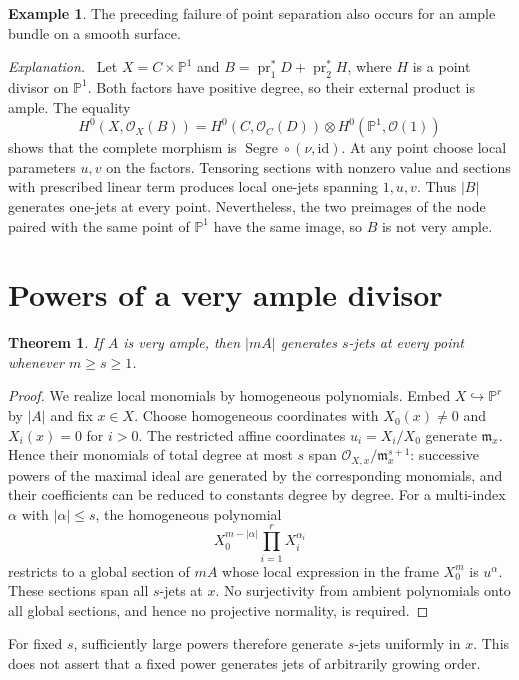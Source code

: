 \documentclass[12pt,a4paper,psamsfonts]{amsart}
\newtheorem{theorem}[lemma]{Theorem}
\theoremstyle{definition}
\newtheorem{example}[lemma]{Example}
\newenvironment{explanation}{\par\noindent\emph{Explanation.}\ }{\par}
\newcommand{\OO}{\mathcal O}
\begin{document}
\begin{example}
The preceding failure of point separation also occurs for an ample
bundle on a smooth surface.
\end{example}
\begin{explanation}
Let $X=C\times\mathbb P^1$ and
$B=\operatorname{pr}_1^*D+\operatorname{pr}_2^*H$, where $H$ is a
point divisor on $\mathbb P^1$.
Both factors have positive degree, so their external product is ample.
The equality
\[
 H^0(X,\OO_X(B))=H^0(C,\OO_C(D))\otimes H^0(\mathbb P^1,\OO(1))
\]
shows that the complete morphism is $\operatorname{Segre}\circ(\nu,\mathrm{id})$.
At any point choose local parameters $u,v$ on the factors. Tensoring
sections with nonzero value and sections with prescribed linear term
produces local one-jets spanning $1,u,v$. Thus $|B|$ generates one-jets
at every point. Nevertheless, the two preimages of the node paired
with the same point of $\mathbb P^1$ have the same image, so $B$ is
not very ample.
\end{explanation}

\section{Powers of a very ample divisor}
\begin{theorem}
If $A$ is very ample, then $|mA|$ generates $s$-jets at every point
whenever $m\ge s\ge1$.
\end{theorem}
\begin{proof}
We realize local monomials by homogeneous polynomials.
Embed $X\hookrightarrow\mathbb P^r$ by $|A|$ and fix $x\in X$.
Choose homogeneous coordinates with $X_0(x)\ne0$ and $X_i(x)=0$
for $i>0$. The restricted affine coordinates $u_i=X_i/X_0$ generate
$\mathfrak m_x$. Hence their monomials of total degree at most $s$
span $\OO_{X,x}/\mathfrak m_x^{s+1}$: successive powers of the maximal
ideal are generated by the corresponding monomials, and their
coefficients can be reduced to constants degree by degree.
For a multi-index $\alpha$ with $|\alpha|\le s$, the homogeneous
polynomial
\[
 X_0^{m-|\alpha|}\prod_{i=1}^r X_i^{\alpha_i}
\]
restricts to a global section of $mA$ whose local expression in the
frame $X_0^m$ is $u^\alpha$. These sections span all $s$-jets at $x$.
No surjectivity from ambient polynomials onto all global sections,
and hence no projective normality, is required.
\end{proof}
For fixed $s$, sufficiently large powers therefore generate $s$-jets
uniformly in $x$. This does not assert that a fixed power generates
jets of arbitrarily growing order.
\end{document}

